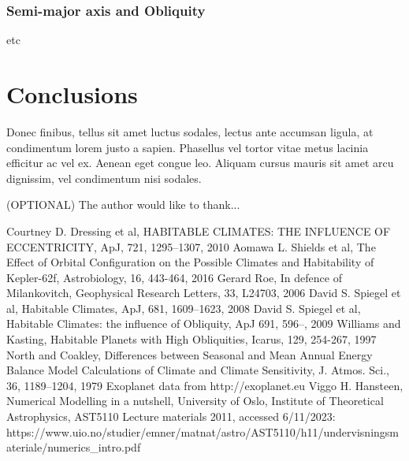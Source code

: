 \documentclass[12pt, onecolumn]{revtex4-2}    %
\begin{document}
\subsubsection*{Semi-major axis and Obliquity}

etc

\section{Conclusions} \label{sec:conclusion}

Donec finibus, tellus sit amet luctus sodales, lectus ante accumsan ligula, at condimentum lorem justo a sapien. Phasellus vel tortor vitae metus lacinia efficitur ac vel ex. Aenean eget congue leo. Aliquam cursus mauris sit amet arcu dignissim, vel condimentum nisi sodales.

\begin{acknowledgments}
    (OPTIONAL) The author would like to thank...
\end{acknowledgments}

\begin{thebibliography}{}
     Courtney D. Dressing et al, HABITABLE CLIMATES: THE INFLUENCE OF ECCENTRICITY, ApJ, 721, 1295--1307, 2010
     Aomawa L. Shields et al, The Effect of Orbital Configuration on the Possible Climates and Habitability of Kepler-62f, Astrobiology, 16, 443-464, 2016
     Gerard Roe, In defence of Milankovitch, Geophysical Research Letters, 33, L24703, 2006
     David S. Spiegel et al, Habitable Climates, ApJ, 681, 1609--1623, 2008
     David S. Spiegel et al, Habitable Climates: the influence of Obliquity, ApJ 691, 596--, 2009
     Williams and Kasting, Habitable Planets with High Obliquities, Icarus, 129, 254-267, 1997
     North and Coakley, Differences between Seasonal and Mean Annual Energy Balance Model Calculations of Climate and Climate Sensitivity, J. Atmos. Sci., 36, 1189--1204, 1979
     Exoplanet data from http://exoplanet.eu
     Viggo H. Hansteen, Numerical Modelling in a nutshell, University of Oslo, Institute of Theoretical Astrophysics, AST5110 Lecture materials 2011, accessed 6/11/2023: https://www.uio.no/studier/emner/matnat/astro/AST5110/h11/undervisningsmateriale/numerics\_intro.pdf
\end{thebibliography}
\end{document}
